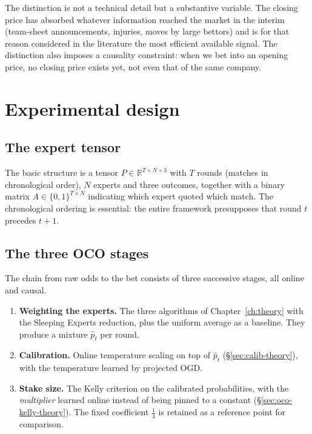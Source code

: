\documentclass[12pt,a4paper,oneside]{report}
\renewcommand{\_}{\oldunderscore\allowbreak}
\theoremstyle{definition}
\theoremstyle{plain}
\theoremstyle{remark}
\begin{document}
The distinction is not a technical detail but a substantive variable. The closing price has
absorbed whatever information reached the market in the interim (team-sheet announcements,
injuries, moves by large bettors) and is for that reason considered in the literature the most
efficient available signal. The distinction also imposes a causality constraint: when we bet
into an opening price, no closing price exists yet, not even that of the same company.

\section{Experimental design}

\subsection{The expert tensor}

The basic structure is a tensor $P \in \mathbb{R}^{T \times N \times 3}$ with $T$ rounds
(matches in chronological order), $N$ experts and three outcomes, together with a binary matrix
$A \in \{0,1\}^{T \times N}$ indicating which expert quoted which match. The chronological
ordering is essential: the entire framework presupposes that round $t$ precedes $t+1$.

\subsection{The three OCO stages}

The chain from raw odds to the bet consists of three successive stages, all online and causal.

\begin{enumerate}
  \item \textbf{Weighting the experts.} The three algorithms of Chapter~\ref{ch:theory} with the
        Sleeping Experts reduction, plus the uniform average as a baseline. They produce a
        mixture $\hat{p}_t$ per round.
  \item \textbf{Calibration.} Online temperature scaling on top of $\hat{p}_t$
        (\S\ref{sec:calib-theory}), with the temperature learned by projected OGD.
  \item \textbf{Stake size.} The Kelly criterion on the calibrated probabilities, with the
        \emph{multiplier} learned online instead of being pinned to a constant
        (\S\ref{sec:oco-kelly-theory}). The fixed coefficient $\tfrac14$ is retained as a
        reference point for comparison.
\end{enumerate}
\end{document}
